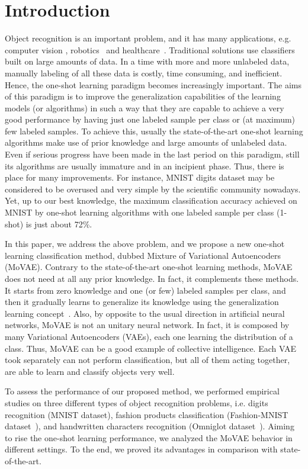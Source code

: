 \documentclass[sigconf,authorversion=true]{aamas}  %
\begin{document}
\section{Introduction}
Object recognition is an important problem, and it has many applications, e.g. computer vision \cite{Dalal2005,7410370,7298854,thewlis17Bunsupervised}, robotics~\cite{LONCOMILLA2016499} and healthcare~\cite{corr/LitjensKBSCGLGS17}. Traditional solutions use classifiers built on large amounts of data. In a time with more and more unlabeled data, manually labeling of all these data is costly, time consuming, and inefficient. Hence, the one-shot learning paradigm becomes increasingly important. The aims of this paradigm is to improve the generalization capabilities of the learning models (or algorithms) in such a way that they are capable to achieve a very good performance by having just one labeled sample per class or (at maximum) few labeled samples. To achieve this, usually the state-of-the-art one-shot learning algorithms make use of prior knowledge and large amounts of unlabeled data. Even if serious progress have been made in the last period on this paradigm, still its algorithms are usually immature and in an incipient phase. Thus,  there is place for many improvements. For instance, MNIST digits dataset may be considered to be overused and very simple by the scientific community nowadays. Yet, up to our best knowledge, the maximum classification accuracy achieved on MNIST by one-shot learning algorithms with one labeled sample per class (1-shot) is just about 72\%.


In this paper, we address the above problem, and we propose a new one-shot learning classification method, dubbed Mixture of Variational Autoencoders (MoVAE). Contrary to the state-of-the-art one-shot learning methods, MoVAE does not need at all any prior knowledge. In fact, it complements these methods. It starts from zero knowledge and one (or few) labeled samples per class, and then it gradually learns to generalize its knowledge using the generalization learning concept~\cite{WATERMAN1970}. Also, by opposite to the usual direction in artificial neural networks, MoVAE is not an unitary neural network. In fact, it is composed by many Variational Autoencoders (VAEs), each one learning the distribution of a class. Thus, MoVAE can be a good example of collective intelligence. Each VAE took separately can not perform classification, but all of them acting together, are able to learn and classify objects very well.

To assess the performance of our proposed method, we performed empirical studies on three different types of object recognition problems, i.e. digits recognition (MNIST dataset), fashion products classification (Fashion-MNIST dataset~\cite{xiao2017FashionMNIST}), and handwritten characters recognition (Omniglot dataset~\cite{salutomniglot}). Aiming to rise the one-shot learning performance, we analyzed the MoVAE behavior in different settings. To the end, we proved its advantages in comparison with state-of-the-art.
\end{document}
